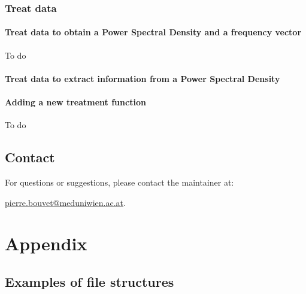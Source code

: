 \documentclass{book}
\begin{document}
    \section{Treat data} \label{sec:treatment}
        

        \subsection{Treat data to obtain a Power Spectral Density and a frequency vector} \label{subsec:treatment.toPSD}
            \begin{tcolorbox}
                To do
            \end{tcolorbox}
        \subsection{Treat data to extract information from a Power Spectral Density} \label{subsec:treatment.toInfo}
            
        \subsection{Adding a new treatment function} \label{subsec:treatment.new}
            \begin{tcolorbox}
                To do
            \end{tcolorbox}


\chapter*{Contact}
    For questions or suggestions, please contact the maintainer at:
    \begin{center}
        \href{mailto:pierre.bouvet@meduniwien.ac.at}{pierre.bouvet@meduniwien.ac.at}.
    \end{center}




\appendix

\part*{Appendix}

\chapter{Examples of file structures}  
\end{document}
